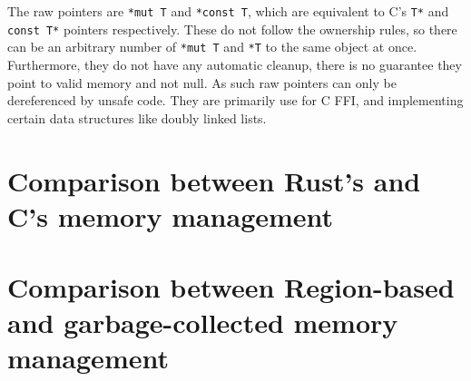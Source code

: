 \documentclass[10pt,a4paper,twocolumn]{article}
\begin{document}
The raw pointers are \lstinline{*mut T} and \lstinline{*const T}, which are equivalent to C's
\lstinline{T*} and \lstinline{const T*} pointers respectively.
These do not follow the ownership rules, so there can be an arbitrary number of \lstinline{*mut T}
and \lstinline{*T} to the same object at once.
Furthermore, they do not have any automatic cleanup, there is no guarantee they point to valid
memory and not null.
As such raw pointers can only be dereferenced by unsafe code.
They are primarily use for C FFI, and implementing certain data structures like doubly linked lists.

\section{Comparison between Rust's and C's memory management}

\section{Comparison between Region-based and garbage-collected memory management}
\end{document}
